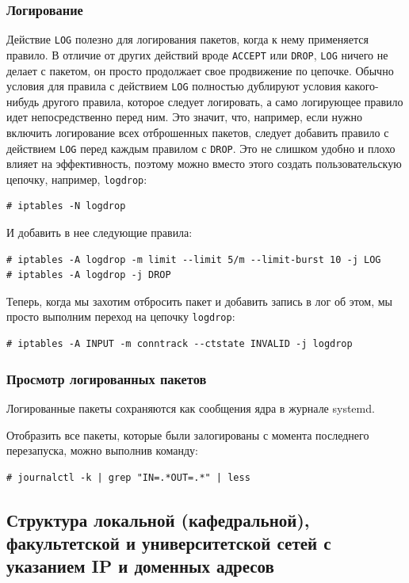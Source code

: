 \documentclass[a4paper]{article}
\begin{document}
		\subsubsection{Логирование}
		
		Действие \texttt{LOG} полезно для логирования пакетов, когда к нему применяется правило. В отличие от других действий вроде \texttt{ACCEPT} или \texttt{DROP}, \texttt{LOG} ничего не делает с пакетом, он просто продолжает свое продвижение по цепочке. Обычно условия для правила с действием \texttt{LOG} полностью дублируют условия какого-нибудь другого правила, которое следует логировать, а само логирующее правило идет непосредственно перед ним. Это значит, что, например, если нужно включить логирование всех отброшенных пакетов, следует добавить правило с действием \texttt{LOG} перед каждым правилом с \texttt{DROP}. Это не слишком удобно и плохо влияет на эффективность, поэтому можно вместо этого создать пользовательскую цепочку, например, \texttt{logdrop}:
		\begin{verbatim}
# iptables -N logdrop
		\end{verbatim}
		И добавить в нее следующие правила:
		\begin{verbatim}
# iptables -A logdrop -m limit --limit 5/m --limit-burst 10 -j LOG
# iptables -A logdrop -j DROP
		\end{verbatim}
		Теперь, когда мы захотим отбросить пакет и добавить запись в лог об этом, мы просто выполним переход на цепочку \texttt{logdrop}:
		\begin{verbatim}
# iptables -A INPUT -m conntrack --ctstate INVALID -j logdrop
		\end{verbatim}
		
		\subsubsection{Просмотр логированных пакетов}
		
		Логированные пакеты сохраняются как сообщения ядра в журнале systemd.
		
		Отобразить все пакеты, которые были залогированы с момента последнего перезапуска, можно выполнив команду:
		
		\begin{verbatim}
# journalctl -k | grep "IN=.*OUT=.*" | less
		\end{verbatim}	
		
	\subsection{Структура локальной (кафедральной), факультетской и университетской сетей с указанием IP и доменных адресов}
	
\end{document}
